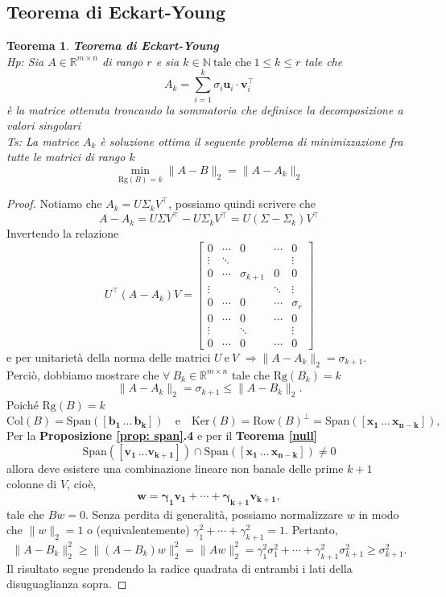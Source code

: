 \documentclass[11pt]{article}
\newtheorem{theorem}{Teorema}
\newcommand{\R}{\mathbb{R}}
\begin{document}
\subsection{Teorema di Eckart-Young}
\begin{theorem}\label{EY}
\textbf{Teorema di Eckart-Young}\\
\textit{Hp:} Sia $A \in \R^{m \times n}$ di rango $r$ e sia $k \in \mathbb{N} \ \text{tale che} \ 1 \leq k \leq r$ tale che $$A_k= \sum_{i=1}^{k} \sigma_i \mathbf{u}_i \cdot \mathbf{v}_i^\top      $$ è la matrice ottenuta troncando la sommatoria che definisce la decomposizione a valori singolari\\
\textit{Ts:} La matrice $A_k$ è soluzione ottima il seguente problema di minimizzazione fra tutte le matrici di rango $k$
\[
\min_{\text{Rg}(B) = k} \|A - B\|_2 = \|A - A_k\|_2
\]
\end{theorem}
\begin{proof}
Notiamo che $A_k = U \Sigma_k V^\top      $, possiamo quindi scrivere che 
\[ A - A_k = U \Sigma V^\top       - U \Sigma_k V^\top       = U (\Sigma - \Sigma_k) V^\top       \]
Invertendo la relazione
\[ U^\top      (A-A_k)V = \begin{bmatrix}
0 & \cdots & 0 & \cdots & 0 \\
\vdots & \ddots & & & \vdots \\
0 & \cdots & \sigma_{k+1} & 0 & 0 \\
\vdots & & & \ddots & \vdots \\
0 & \cdots & 0 & \cdots & \sigma_{r} \\
0 & \cdots & 0 & \cdots & 0 \\
\vdots &  & \ddots & & \vdots \\
0 & \cdots & 0 & \cdots & 0
\end{bmatrix} \]
e per unitarietà della norma delle matrici $U \ \text{e} \ V$ $\Rightarrow \|A-A_k\|_2=\sigma_{k+1}$.\\
Perciò, dobbiamo mostrare che  $\forall \ B_k \in \R^{m \times n}$ tale che $\text{Rg}(B_k)=k$ 
$$
\|A-A_k\|_2 = \sigma_{k+1} \leq \|A-B_k\|_2.
$$
Poiché $\text{Rg}(B)=k$ 
\[
\text{Col}(B) = \text{Span}(\mathbf{[b_1 \, \dots \, b_k]}) \quad \text{e} \quad \text{Ker}(B) =\text{Row}(B)^\perp = \text{Span}(\mathbf{[x_{1} \, \dots \, x_{n-k}]}),
\] 
Per la \textbf{Proposizione \ref{prop: span}.4} e per il \textbf{Teorema \ref{null}}
\[
\text{Span}(\mathbf{[v_1 \, \dots v_{k+1}]}) \cap \text{Span}(\mathbf{[x_{1} \, \dots \, x_{n-k}]}) \neq 0
\]
allora deve esistere una combinazione lineare non banale delle prime $k+1$ colonne di $V$, cioè,
\[
\mathbf{w = \gamma_1v_1 + \cdots + \gamma_{k+1}v_{k+1}},
\]
tale che $Bw = 0$. Senza perdita di generalità, possiamo normalizzare $w$ in modo che $\|w\|_2 = 1$ o (equivalentemente) $\gamma_1^2 + \cdots + \gamma_{k+1}^2 = 1$. Pertanto,
\[
\|A-B_k\|_2^2 \geq \|(A-B_k)w\|_2^2 = \|Aw\|_2^2 = \gamma_1^2\sigma_1^2 + \cdots + \gamma_{k+1}^2\sigma_{k+1}^2 \geq \sigma_{k+1}^2.
\]
Il risultato segue prendendo la radice quadrata di entrambi i lati della disuguaglianza sopra.
\end{proof}
\end{document}
